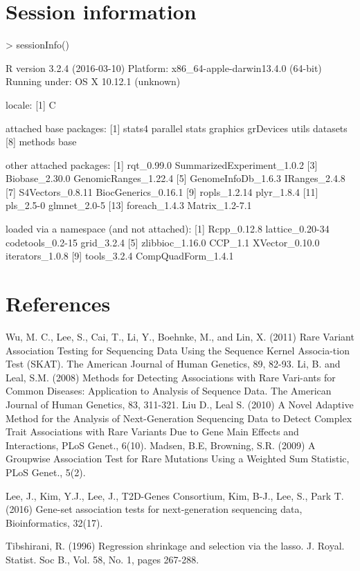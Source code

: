 \documentclass{article}
\begin{document}
\section{Session information}
\begin{Schunk}
\begin{Sinput}
> sessionInfo()
\end{Sinput}
\begin{Soutput}
R version 3.2.4 (2016-03-10)
Platform: x86_64-apple-darwin13.4.0 (64-bit)
Running under: OS X 10.12.1 (unknown)

locale:
[1] C

attached base packages:
[1] stats4    parallel  stats     graphics  grDevices utils     datasets 
[8] methods   base     

other attached packages:
 [1] rqt_0.99.0                 SummarizedExperiment_1.0.2
 [3] Biobase_2.30.0             GenomicRanges_1.22.4      
 [5] GenomeInfoDb_1.6.3         IRanges_2.4.8             
 [7] S4Vectors_0.8.11           BiocGenerics_0.16.1       
 [9] ropls_1.2.14               plyr_1.8.4                
[11] pls_2.5-0                  glmnet_2.0-5              
[13] foreach_1.4.3              Matrix_1.2-7.1            

loaded via a namespace (and not attached):
 [1] Rcpp_0.12.8        lattice_0.20-34    codetools_0.2-15   grid_3.2.4        
 [5] zlibbioc_1.16.0    CCP_1.1            XVector_0.10.0     iterators_1.0.8   
 [9] tools_3.2.4        CompQuadForm_1.4.1
\end{Soutput}
\end{Schunk}
\clearpage
\section{References}
\begin{thebibliography}{00}

 Wu, M. C., Lee, S., Cai, T., Li, Y., Boehnke, M., 
and Lin, X. (2011) 
Rare Variant Association Testing for Sequencing Data Using the Sequence 
Kernel Associa-tion Test (SKAT). The American Journal of 
Human Genetics, 89, 82-93.
 Li, B. and Leal, S.M. (2008) Methods for 
Detecting Associations 
with Rare Vari-ants for Common Diseases: Application to Analysis 
of Sequence Data. The American Journal of Human Genetics, 83, 311-321.
 Liu D., Leal S. (2010) A Novel Adaptive Method for 
the Analysis 
of Next-Generation Sequencing Data to Detect Complex Trait 
Associations with Rare Variants Due to Gene Main Effects and 
Interactions, PLoS Genet., 6(10).
 Madsen, B.E, Browning, S.R. (2009) 
A Groupwise Association 
Test for Rare Mutations Using a Weighted Sum Statistic, PLoS Genet., 5(2).

 Lee, J., Kim, Y.J., Lee, J., T2D-Genes Consortium, 
Kim, B-J., 
Lee, S., Park T. (2016) Gene-set association tests for 
next-generation sequencing data, Bioinformatics, 32(17).

 Tibshirani, R. (1996) Regression shrinkage 
and selection 
via the lasso. J. Royal. Statist. Soc B., Vol. 58, No. 1, pages 267-288.
\end{thebibliography}
\end{document}

